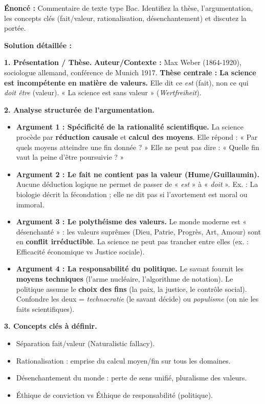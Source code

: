 \documentclass[11pt]{article}
\newcommand{\cle}[1]{{\popxbold\color{popdark}#1}}
\begin{document}
\begin{exoresolu}
\textbf{Énoncé :} Commentaire de texte type Bac. Identifiez la thèse, l'argumentation, les concepts clés (fait/valeur, rationalisation, désenchantement) et discutez la portée.

\tcblower
\textbf{Solution détaillée :}

\textbf{1. Présentation / Thèse.}
\textbf{Auteur/Contexte :} Max Weber (1864-1920), sociologue allemand, conférence de Munich 1917. \textbf{Thèse centrale :} \textbf{La science est incompétente en matière de valeurs.} Elle dit ce \emph{est} (fait), non ce qui \emph{doit être} (valeur). « La science est sans valeur » (\emph{Wertfreiheit}).

\textbf{2. Analyse structurée de l'argumentation.}
\begin{itemize}
    \item \textbf{Argument 1 : Spécificité de la rationalité scientifique.} La science procède par \textbf{réduction causale} et \textbf{calcul des moyens}. Elle répond : « Par quels moyens atteindre une fin donnée ? » Elle ne peut pas dire : « Quelle fin vaut la peine d'être poursuivie ? »
    \item \textbf{Argument 2 : Le fait ne contient pas la valeur (Hume/Guillaumin).} Aucune déduction logique ne permet de passer de « \emph{est} » à « \emph{doit} ». Ex. : La biologie décrit la fécondation ; elle ne dit pas si l'avortement est moral ou immoral.
    \item \textbf{Argument 3 : Le polythéisme des valeurs.} Le monde moderne est « désenchanté » : les valeurs suprêmes (Dieu, Patrie, Progrès, Art, Amour) sont en \textbf{conflit irréductible}. La science ne peut pas trancher entre elles (ex. : Efficacité économique vs Justice sociale).
    \item \textbf{Argument 4 : La responsabilité du politique.} Le savant fournit les \textbf{moyens techniques} (l'arme nucléaire, l'algorithme de notation). Le politique assume le \textbf{choix des fins} (la paix, la justice, le contrôle social). Confondre les deux = \emph{technocratie} (le savant décide) ou \emph{populisme} (on nie les faits scientifiques).
\end{itemize}

\textbf{3. Concepts clés à définir.}
\begin{itemize}
    \item \cle{Séparation fait/valeur} (Naturalistic fallacy).
    \item \cle{Rationalisation} : emprise du calcul moyen/fin sur tous les domaines.
    \item \cle{Désenchantement du monde} : perte de sens unifié, pluralisme des valeurs.
    \item \cle{Éthique de conviction vs Éthique de responsabilité} (politique).
\end{itemize}


\end{exoresolu}
\end{document}
